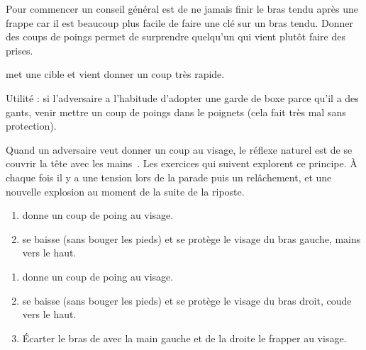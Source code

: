 Pour commencer un conseil général est de ne jamais finir le bras tendu après une frappe car il est beaucoup plus facile de faire une clé sur un bras tendu.
Donner des coups de poings permet de surprendre quelqu'un qui vient plutôt faire des prises.


\begin{exercice}

\A met une cible et \D vient donner un coup très rapide.

Utilité : si l'adversaire a l'habitude d'adopter une garde de boxe parce qu'il a des gants, venir mettre un coup de poings dans le poignets (cela fait très mal sans protection).

\end{exercice}


Quand un adversaire veut donner un coup au visage, le réflexe naturel est de se couvrir la tête avec les mains~\cite{enzi:dijon:messer_inner:2015}.
Les exercices qui suivent explorent ce principe.
À chaque fois il y a une tension lors de la parade puis un relâchement, et une nouvelle explosion au moment de la suite de la riposte.


\begin{exercice}
\label{mains-nues:ex:enzi-1}

\begin{enumerate}
	\item \A donne un coup de poing au visage.
	\item \D se baisse (sans bouger les pieds) et se protège le visage du bras gauche, mains vers le haut.
\end{enumerate}

\end{exercice}


\begin{exercice}
\label{mains-nues:ex:enzi-2}

\begin{enumerate}
	\item \A donne un coup de poing au visage.
	\item \D se baisse (sans bouger les pieds) et se protège le visage du bras droit, coude vers le haut.
	\item Écarter le bras de \A avec la main gauche et de la droite le frapper au visage.
\end{enumerate}

\end{exercice}


